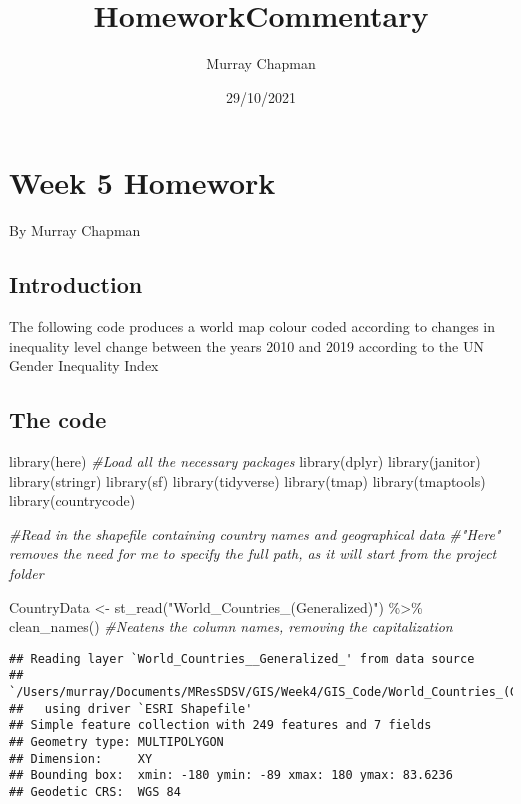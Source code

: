\documentclass[
]{article}
\title{HomeworkCommentary}
\author{Murray Chapman}
\date{29/10/2021}
\newenvironment{Shaded}{\begin{snugshade}}{\end{snugshade}}
\newcommand{\CommentTok}[1]{\textcolor[rgb]{0.56,0.35,0.01}{\textit{#1}}}
\newcommand{\FunctionTok}[1]{\textcolor[rgb]{0.00,0.00,0.00}{#1}}
\newcommand{\NormalTok}[1]{#1}
\newcommand{\OtherTok}[1]{\textcolor[rgb]{0.56,0.35,0.01}{#1}}
\newcommand{\SpecialCharTok}[1]{\textcolor[rgb]{0.00,0.00,0.00}{#1}}
\newcommand{\StringTok}[1]{\textcolor[rgb]{0.31,0.60,0.02}{#1}}
\begin{document}
\maketitle

\hypertarget{week-5-homework}{%
\section{Week 5 Homework}\label{week-5-homework}}

By Murray Chapman

\hypertarget{introduction}{%
\subsection{Introduction}\label{introduction}}

The following code produces a world map colour coded according to
changes in inequality level change between the years 2010 and 2019
according to the UN Gender Inequality Index

\hypertarget{the-code}{%
\subsection{The code}\label{the-code}}

\begin{Shaded}
\begin{Highlighting}[]
\FunctionTok{library}\NormalTok{(here) }\CommentTok{\#Load all the necessary packages}
\FunctionTok{library}\NormalTok{(dplyr)}
\FunctionTok{library}\NormalTok{(janitor)}
\FunctionTok{library}\NormalTok{(stringr)}
\FunctionTok{library}\NormalTok{(sf)}
\FunctionTok{library}\NormalTok{(tidyverse)}
\FunctionTok{library}\NormalTok{(tmap)}
\FunctionTok{library}\NormalTok{(tmaptools)}
\FunctionTok{library}\NormalTok{(countrycode)}

\CommentTok{\#Read in the shapefile containing country names and geographical data}
\CommentTok{\#"Here" removes the need for me to specify the full path, as it will start from the project folder}

\NormalTok{CountryData }\OtherTok{\textless{}{-}} \FunctionTok{st\_read}\NormalTok{(}\StringTok{"World\_Countries\_(Generalized)"}\NormalTok{) }\SpecialCharTok{\%\textgreater{}\%}
  \FunctionTok{clean\_names}\NormalTok{() }\CommentTok{\#Neatens the column names, removing the capitalization}
\end{Highlighting}
\end{Shaded}

\begin{verbatim}
## Reading layer `World_Countries__Generalized_' from data source 
##   `/Users/murray/Documents/MResSDSV/GIS/Week4/GIS_Code/World_Countries_(Generalized)' 
##   using driver `ESRI Shapefile'
## Simple feature collection with 249 features and 7 fields
## Geometry type: MULTIPOLYGON
## Dimension:     XY
## Bounding box:  xmin: -180 ymin: -89 xmax: 180 ymax: 83.6236
## Geodetic CRS:  WGS 84
\end{verbatim}
\end{document}
